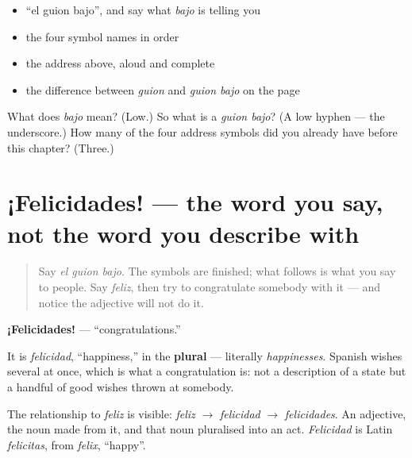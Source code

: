 \begin{itemize}
\raggedright
  \item \textquotedblleft{}el guion bajo\textquotedblright{}, and say what \emph{bajo} is telling you
  \item the four symbol names in order
  \item the address above, aloud and complete
  \item the difference between \emph{guion} and \emph{guion bajo} on the page
\end{itemize}

\begin{tcolorbox}[breakable,colback=teal!4,colframe=teal!35!black,title={Before you move on}]
What does \emph{bajo} mean? (Low.) So what is a \emph{guion bajo}? (A low hyphen — the underscore.) How many of the four address symbols did you already have before this chapter? (Three.)
\end{tcolorbox}
\section[¡Felicidades!]{¡Felicidades! — the word you say, not the word you describe with}

\label{lesson:ES-C428-felicidades}



\begin{quote}
Say \emph{el guion bajo}. The symbols are finished; what follows is what you say to people. Say \emph{feliz}, then try to congratulate somebody with it — and notice the adjective will not do it.
\end{quote}

\begin{cousinweb}
\textbf{¡Felicidades!} — \textquotedblleft{}congratulations.\textquotedblright{}

It is \emph{felicidad}, \textquotedblleft{}happiness,\textquotedblright{} in the \textbf{plural} — literally \emph{happinesses}. Spanish wishes several at once, which is what a congratulation is: not a description of a state but a handful of good wishes thrown at somebody.

The relationship to \emph{feliz} is visible: \emph{feliz} $\to$ \emph{felicidad} $\to$ \emph{felicidades}. An adjective, the noun made from it, and that noun pluralised into an act. \emph{Felicidad} is Latin \emph{felicitas}, from \emph{felix}, \textquotedblleft{}happy\textquotedblright{}.
\end{cousinweb}

